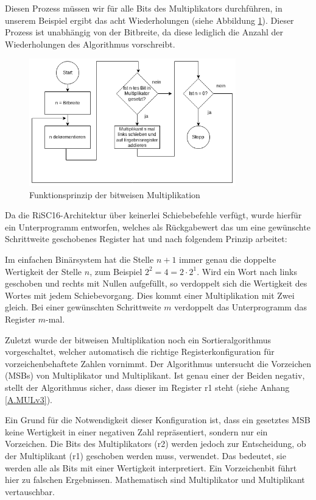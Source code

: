 \documentclass[fleqn, a4paper, 11pt]{article}       %
\begin{document}
\noindent Diesen Prozess müssen wir für alle Bits des Multiplikators durchführen, in unserem Beispiel ergibt das acht Wiederholungen (siehe Abbildung \ref{fig:bitw_Mul_Prinzip}). Dieser Prozess ist unabhängig von der Bitbreite, da diese lediglich die Anzahl der Wiederholungen des Algorithmus vorschreibt.



\begin{figure}[h]
    \includegraphics[width =0.8\textwidth]{bitweise_Mul_Prinzip.png}
\caption{Funktionsprinzip der bitweisen Multiplikation}
\label{fig:bitw_Mul_Prinzip}
\end{figure}



\noindent Da die RiSC16-Architektur über keinerlei Schiebebefehle verfügt, wurde hierfür ein Unterprogramm entworfen, welches als Rückgabewert das um eine gewünschte Schrittweite geschobenes Register hat und nach folgendem Prinzip arbeitet:

Im einfachen Binärsystem hat die Stelle $n+1$ immer genau die doppelte Wertigkeit der Stelle $n$, zum Beispiel $2^2 = 4 = 2 \cdot 2^1$. Wird ein Wort nach links geschoben und  rechts mit Nullen aufgefüllt, so verdoppelt sich die Wertigkeit des Wortes mit jedem Schiebevorgang. Dies kommt einer Multiplikation mit Zwei gleich. Bei einer gewünschten Schrittweite $m$ verdoppelt das Unterprogramm das Register  $m$-mal.

Zuletzt wurde der bitweisen Multiplikation noch ein Sortieralgorithmus vorgeschaltet, welcher automatisch die richtige Registerkonfiguration für vorzeichenbehaftete Zahlen vornimmt. Der Algorithmus untersucht die Vorzeichen (MSBs) von Multiplikator und Multiplikant. Ist genau einer der Beiden negativ, stellt der Algorithmus sicher, dass dieser im Register r1 steht (siehe Anhang \ref{A.MULv3}). 

 Ein Grund für die Notwendigkeit dieser Konfiguration ist, dass ein gesetztes MSB keine Wertigkeit in einer negativen  Zahl repräsentiert, sondern nur ein Vorzeichen. Die Bits des Multiplikators (r2) werden jedoch zur Entscheidung, ob der Multiplikant (r1) geschoben werden muss, verwendet. Das bedeutet, sie werden alle als Bits mit einer Wertigkeit interpretiert. Ein Vorzeichenbit führt hier zu falschen Ergebnissen. Mathematisch sind Multiplikator und Multiplikant vertauschbar.
\end{document}

